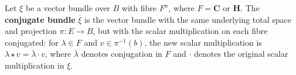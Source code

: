 Let $\xi$ be a vector bundle over $B$ with fibre $F^n$, where $F = \mathbf{C}$ or $\mathbf{H}$. The \textbf{conjugate bundle} $\overline{\xi}$ is the vector bundle with the same underlying total space and projection $\pi \colon E \to B$, but with the scalar multiplication on each fibre conjugated: for $\lambda \in F$ and $v \in \pi^{-1}(b)$, the new scalar multiplication is $\lambda \star v = \overline{\lambda} \cdot v$, where $\overline{\lambda}$ denotes conjugation in $F$ and $\cdot$ denotes the original scalar multiplication in $\xi$.
